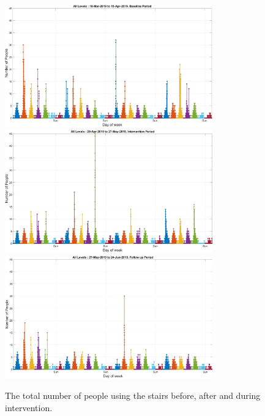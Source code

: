  
\begin{figure}[htbp]
    \includegraphics[width=0.8\textwidth]{image/Chapters/Chapter6/18-Mar-2019Base.jpg}
    \includegraphics[width=0.8\textwidth]{image/Chapters/Chapter6/29-Apr-2019Int.jpg}
    \includegraphics[width=0.8\textwidth]{image/Chapters/Chapter6/27-May-2019Follow.jpg}
    \caption{The total number of people using the stairs before, after and during intervention.}
    \label{3mon}
\end{figure}

